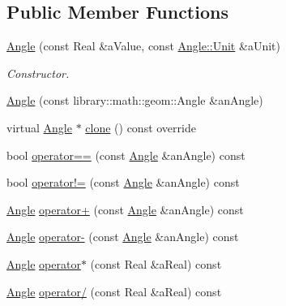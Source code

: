 \subsection*{Public Member Functions}
\begin{DoxyCompactItemize}
\item 
\hyperlink{classlibrary_1_1physics_1_1units_1_1_angle_a6cd94e306cdc3a15fe13135729299d99}{Angle} (const Real \&a\+Value, const \hyperlink{classlibrary_1_1physics_1_1units_1_1_angle_a3c329d415a61783b16ce481874cc5956}{Angle\+::\+Unit} \&a\+Unit)
\begin{DoxyCompactList}\small\item\em Constructor. \end{DoxyCompactList}\item 
\hyperlink{classlibrary_1_1physics_1_1units_1_1_angle_a6c841e6d88730f6b1289b02dccf591f1}{Angle} (const library\+::math\+::geom\+::\+Angle \&an\+Angle)
\item 
virtual \hyperlink{classlibrary_1_1physics_1_1units_1_1_angle}{Angle} $\ast$ \hyperlink{classlibrary_1_1physics_1_1units_1_1_angle_add51af263128e384d3d89827d0f70dcf}{clone} () const override
\item 
bool \hyperlink{classlibrary_1_1physics_1_1units_1_1_angle_a7438eef61dd54f58c4270fae0d2ccb20}{operator==} (const \hyperlink{classlibrary_1_1physics_1_1units_1_1_angle}{Angle} \&an\+Angle) const
\item 
bool \hyperlink{classlibrary_1_1physics_1_1units_1_1_angle_ad25b468efa92e37f8d45d624a9ed6497}{operator!=} (const \hyperlink{classlibrary_1_1physics_1_1units_1_1_angle}{Angle} \&an\+Angle) const
\item 
\hyperlink{classlibrary_1_1physics_1_1units_1_1_angle}{Angle} \hyperlink{classlibrary_1_1physics_1_1units_1_1_angle_aebf6869b414e02af92a924d561822824}{operator+} (const \hyperlink{classlibrary_1_1physics_1_1units_1_1_angle}{Angle} \&an\+Angle) const
\item 
\hyperlink{classlibrary_1_1physics_1_1units_1_1_angle}{Angle} \hyperlink{classlibrary_1_1physics_1_1units_1_1_angle_a034a88587139bb8642e80f353ead5ce2}{operator-\/} (const \hyperlink{classlibrary_1_1physics_1_1units_1_1_angle}{Angle} \&an\+Angle) const
\item 
\hyperlink{classlibrary_1_1physics_1_1units_1_1_angle}{Angle} \hyperlink{classlibrary_1_1physics_1_1units_1_1_angle_a958b708b331ded088189882187a4de89}{operator$\ast$} (const Real \&a\+Real) const
\item 
\hyperlink{classlibrary_1_1physics_1_1units_1_1_angle}{Angle} \hyperlink{classlibrary_1_1physics_1_1units_1_1_angle_a4807751951c97b1de78e7b98b51abaed}{operator/} (const Real \&a\+Real) const

\end{DoxyCompactItemize}
